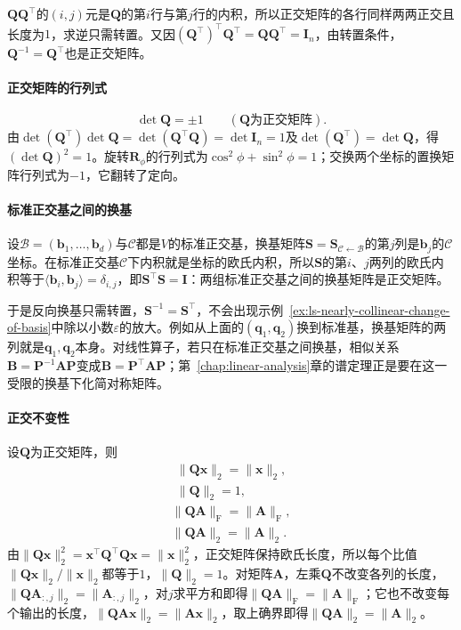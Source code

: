 $\bm Q\bm Q^\top$的$(i,j)$元是$\bm Q$的第$i$行与第$j$行的内积，所以正交矩阵的各行同样两两正交且长度为$1$，求逆只需转置。又因$(\bm Q^\top)^\top\bm Q^\top=\bm Q\bm Q^\top=\bm I_n$，由转置条件，$\bm Q^{-1}=\bm Q^\top$也是正交矩阵。



\paragraph{正交矩阵的行列式}
\[
 \det\bm Q=\pm1\qquad(\bm Q\text{为正交矩阵}).
\]
由$\det(\bm Q^\top)\det\bm Q=\det(\bm Q^\top\bm Q)=\det\bm I_n=1$及$\det(\bm Q^\top)=\det\bm Q$，得$(\det\bm Q)^2=1$。旋转$\bm R_\phi$的行列式为$\cos^2\phi+\sin^2\phi=1$；交换两个坐标的置换矩阵行列式为$-1$，它翻转了定向。



\paragraph{标准正交基之间的换基}
设$\mathcal B=(\bm b_1,\ldots,\bm b_d)$与$\mathcal C$都是$V$的标准正交基，换基矩阵$\bm S=\bm S_{\mathcal C\leftarrow\mathcal B}$的第$j$列是$\bm b_j$的$\mathcal C$坐标。在标准正交基$\mathcal C$下内积就是坐标的欧氏内积，所以$\bm S$的第$i$、$j$两列的欧氏内积等于$\langle\bm b_i,\bm b_j\rangle=\delta_{i,j}$，即$\bm S^\top\bm S=\bm I$：两组标准正交基之间的换基矩阵是正交矩阵。

于是反向换基只需转置，$\bm S^{-1}=\bm S^\top$，不会出现示例~\ref{ex:ls-nearly-collinear-change-of-basis}中除以小数$\varepsilon$的放大。例如从上面的$(\bm q_1,\bm q_2)$换到标准基，换基矩阵的两列就是$\bm q_1,\bm q_2$本身。对线性算子，若只在标准正交基之间换基，相似关系$\bm B=\bm P^{-1}\bm A\bm P$变成$\bm B=\bm P^\top\bm A\bm P$；第~\ref{chap:linear-analysis}章的谱定理正是要在这一受限的换基下化简对称矩阵。

\paragraph{正交不变性}
设$\bm Q$为正交矩阵，则
\[
 \begin{gathered}
 \lVert\bm Q\bm x\rVert_2=\lVert\bm x\rVert_2,\\
 \lVert\bm Q\rVert_2=1,
 \end{gathered}
\]
\[
 \begin{gathered}
 \lVert\bm Q\bm A\rVert_{\mathrm F}=\lVert\bm A\rVert_{\mathrm F},\\
 \lVert\bm Q\bm A\rVert_2=\lVert\bm A\rVert_2.
 \end{gathered}
\]
由$\lVert\bm Q\bm x\rVert_2^2=\bm x^\top\bm Q^\top\bm Q\bm x=\lVert\bm x\rVert_2^2$，正交矩阵保持欧氏长度，所以每个比值$\lVert\bm Q\bm x\rVert_2/\lVert\bm x\rVert_2$都等于$1$，$\lVert\bm Q\rVert_2=1$。对矩阵$\bm A$，左乘$\bm Q$不改变各列的长度，$\lVert\bm Q\bm A_{:,j}\rVert_2=\lVert\bm A_{:,j}\rVert_2$，对$j$求平方和即得$\lVert\bm Q\bm A\rVert_{\mathrm F}=\lVert\bm A\rVert_{\mathrm F}$；它也不改变每个输出的长度，$\lVert\bm Q\bm A\bm x\rVert_2=\lVert\bm A\bm x\rVert_2$，取上确界即得$\lVert\bm Q\bm A\rVert_2=\lVert\bm A\rVert_2$。


